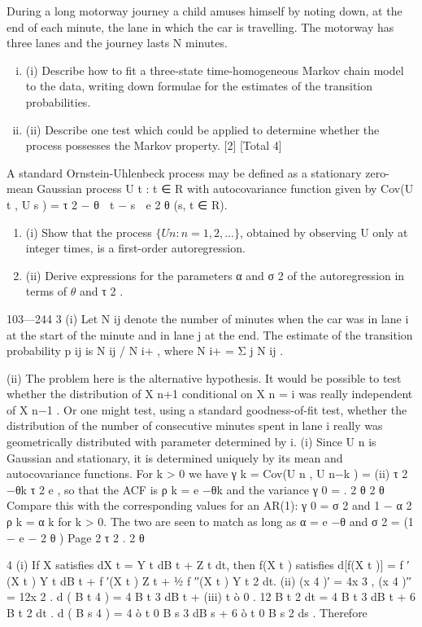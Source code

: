 \documentclass[a4paper,12pt]{article}
\begin{document}
During a long motorway journey a child amuses himself by noting down, at the end of each minute, the lane in which the car is travelling. The motorway has three lanes and the journey lasts N minutes.
\begin{enumerate}[(i)]
\item (i) Describe how to fit a three-state time-homogeneous Markov chain model
to the data, writing down formulae for the estimates of the transition
probabilities.
\item 
(ii) Describe one test which could be applied to determine whether the process
possesses the Markov property. [2]
[Total 4]
\end{enumerate}
\item A standard Ornstein-Uhlenbeck process may be defined as a stationary zero-
mean Gaussian process {U t : t ∈ R} with autocovariance function given by
Cov(U t , U s ) =
τ 2 − θ  t − s 
e
2 θ
(s, t ∈ R).
\begin{enumerate}
\item (i) Show that the process $\{U n : n = 1, 2, ...\}$, obtained by observing U only at
integer times, is a first-order autoregression.
\item 
(ii) Derive expressions for the parameters α and σ 2 of the autoregression in terms of $\theta$ and τ 2 .
\end{enumerate}
103—244
3
(i) Let N ij denote the number of minutes when the car was in lane i at the start of the minute and in lane j at the end. The estimate of the transition probability p ij is N ij / N i+ , where N i+ = Σ j N ij .

(ii) The problem here is the alternative hypothesis. It would be possible to test whether the distribution of X n+1 conditional on X n = i was really independent of X n−1 . Or one might test, using a standard goodness-of-fit
test, whether the distribution of the number of consecutive minutes spent
in lane i really was geometrically distributed with parameter determined
by i.
(i) Since {U n } is Gaussian and stationary, it is determined uniquely by its
mean and autocovariance functions. For k > 0 we have γ k = Cov(U n , U n−k )
=
(ii)
τ 2 −θk
τ 2
e , so that the ACF is ρ k = e −θk and the variance γ 0 =
.
2 θ
2 θ
Compare this with the corresponding values for an AR(1): γ 0 =
σ 2
and
1 − α 2
ρ k = α k for k > 0.
The two are seen to match as long as α = e −θ and σ 2 = (1 − e − 2 θ )
Page 2
τ 2
.
2 θ

4
(i)
If X satisfies dX t = Y t dB t + Z t dt, then f(X t ) satisfies
d[f(X t )] = f ′(X t ) Y t dB t + { f ′(X t ) Z t + 1⁄2 f ′′(X t ) Y t 2 } dt.
(ii)
(x 4 )′ = 4x 3 , (x 4 )′′ = 12x 2 .
d ( B t 4 ) = 4 B t 3 dB t +
(iii)
t
ò 0
. 12 B t 2 dt = 4 B t 3 dB t + 6 B t 2 dt .
d ( B s 4 ) = 4 ò t 0 B s 3 dB s + 6 ò t 0 B s 2 ds .
Therefore
\end{document}
